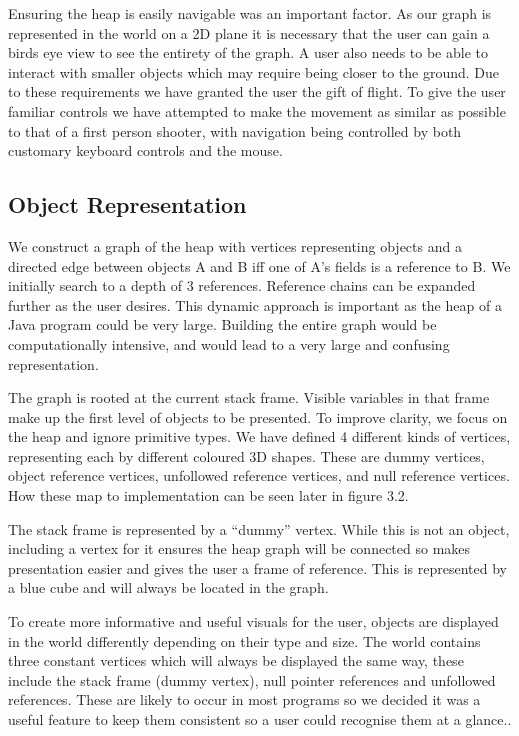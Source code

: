 \documentclass[11pt, a4paper]{report}
\begin{document}
Ensuring the heap is easily navigable was an important factor. As our graph is represented in the world on a 2D plane it is necessary that the user can gain a birds eye view to see the entirety of the graph. A user also needs to be able to interact with smaller objects which may require being closer to the ground. Due to these requirements we have granted the user the gift of flight. To give the user familiar controls we have attempted to make the movement as similar as possible to that of a first person shooter, with navigation being controlled by both customary keyboard controls and the mouse. 

\subsection{Object Representation}

We construct a graph of the heap with vertices representing objects and a directed edge between objects A and B iff one of A’s fields is a reference to B. We initially search to a depth of 3 references. Reference chains can be expanded further as the user desires. This dynamic approach is important as the heap of a Java program could be very large. Building the entire graph would be computationally intensive, and would lead to a very large and confusing representation.

The graph is rooted at the current stack frame. Visible variables in that frame make up the first level of objects to be presented. To improve clarity, we focus on the heap and ignore primitive types. We have defined 4 different kinds of vertices, representing each by different coloured 3D shapes. These are dummy vertices, object reference vertices, unfollowed reference vertices, and null reference vertices. How these map to implementation can be seen later in figure 3.2.

The stack frame is represented by a “dummy” vertex. While this is not an object, including a vertex for it ensures the heap graph will be connected so makes presentation easier and gives the user a frame of reference. This is represented by a blue cube and will always be located in the graph.

To create more informative and useful visuals for the user, objects are displayed in the world differently depending on their type and size. The world contains three constant vertices which will always be displayed the same way, these include the stack frame (dummy vertex), null pointer references and unfollowed references. These are likely to occur in most programs so we decided it was a useful feature to keep them consistent so a user could recognise them at a glance..
\end{document}
